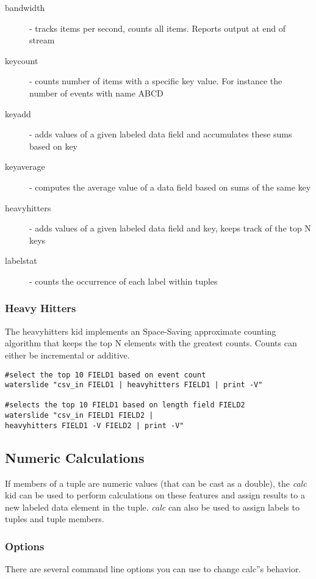 \documentclass[11pt]{article}
\begin{document}
\begin{description}
\item [bandwidth] - tracks items per second, counts all items.  Reports output at end of stream
\item [keycount] - counts number of items with a specific key value.  For instance the number of
events with name ABCD
\item [keyadd] - adds values of a given labeled data field and accumulates these sums based on key
\item [keyaverage] - computes the average value of a data field based on sums of the same key
\item [heavyhitters] - adds values of a given labeled data field and key, keeps track of the top N
keys
\item [labelstat] - counts the occurrence of each label within tuples
\end{description}

\subsubsection{Heavy Hitters}
The heavyhitters kid implements an Space-Saving approximate counting algorithm \cite{heavyhitters} that keeps the top N elements with the greatest counts.  Counts can either be incremental or additive.  
\begin{lstlisting}
#select the top 10 FIELD1 based on event count
waterslide "csv_in FIELD1 | heavyhitters FIELD1 | print -V"

#selects the top 10 FIELD1 based on length field FIELD2
waterslide "csv_in FIELD1 FIELD2 |
heavyhitters FIELD1 -V FIELD2 | print -V"
\end{lstlisting}


\subsection {Numeric Calculations}
If members of a tuple are numeric values (that can be cast as a
double), the \emph{calc} kid can be used to perform calculations on
these features and assign results to a new labeled data element in the
tuple.  \emph{calc} can also be used to assign labels to tuples and
tuple members. 

\subsubsection {Options}

There are several command line options you can use to change calc''s behavior.
\end{document}

